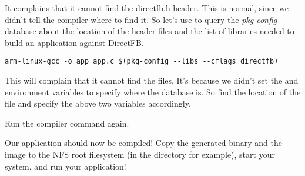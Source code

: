 It complains that it cannot find the directfb.h header. This is
normal, since we didn't tell the compiler where to find it. So let's
use  to query the {\em pkg-config} database about the
location of the header files and the list of libraries needed to build
an application against DirectFB.

\footnotesize
\begin{verbatim}
arm-linux-gcc -o app app.c $(pkg-config --libs --cflags directfb)
\end{verbatim}
\normalsize

This will complain that it cannot find the  files. It's
because we didn't set the  and
 environment variables to specify where the
 database is. So find the location of the  
file and specify the above two variables accordingly.

Run the compiler command again.

Our application should now be compiled! Copy the generated binary and the
 image to the NFS root filesystem (in the
 directory for example), start your system, and run your
application!

